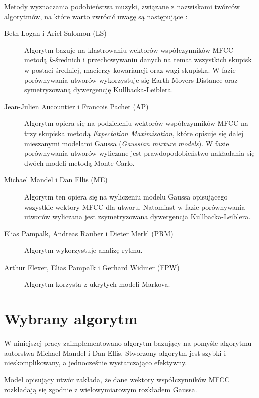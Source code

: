 Metody wyznaczania podobieństwa muzyki, związane z nazwiskami twórców
algorytmów, na które warto zwrócić uwagę są następujące \cite{magisterska}:
\begin{description}
 \item[Beth Logan i Ariel Salomon (LS)] Algorytm bazuje na klastrowaniu wektorów
współczynników MFCC metodą $k$-średnich i przechowywaniu danych na temat
wszystkich skupisk w postaci średniej, macierzy kowariancji oraz wagi skupiska.
W fazie porównywania utworów wykorzystuje się Earth Movers Distance oraz
symetryzowaną dywergencję Kullbacka-Leiblera.
 \item[Jean-Julien Aucountier i Francois Pachet (AP)] Algorytm opiera się na
podzieleniu wektorów współczynników MFCC na trzy skupiska metodą
\textit{Expectation Maximisation}, które opisuje się dalej mieszanymi modelami
Gaussa (\textit{Gaussian mixture models}). W fazie porównywania utworów
wyliczane jest prawdopodobieństwo nakładania się dwóch modeli metodą Monte
Carlo.
 \item[Michael Mandel i Dan Ellis (ME)] Algorytm ten opiera się na wyliczeniu
modelu Gaussa opisującego wszystkie wektory MFCC dla utworu. Natomiast w fazie
porównywania utworów wyliczana jest zsymetryzowana dywergencja
Kullbacka-Leiblera.
 \item[Elias Pampalk, Andreas Rauber i Dieter Merkl (PRM)] Algorytm wykorzystuje
analizę rytmu.
 \item[Arthur Flexer, Elias Pampalk i Gerhard Widmer (FPW)] Algorytm korzysta z
ukrytych modeli Markova.
\end{description}

\section{Wybrany algorytm}
W niniejszej pracy zaimplementowano algorytm bazujący na pomyśle algorytmu
autorstwa Michael Mandel i Dan Ellis.
Stworzony algorytm jest szybki i nieskomplikowany, a jednocześnie
wystarczająco efektywny.

Model opisujący utwór zakłada, że dane wektory współczynników MFCC rozkładają
się zgodnie z wielowymiarowym rozkładem Gaussa.

